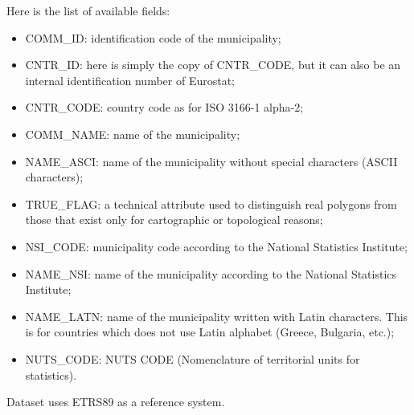 Here is the list of available fields:
\begin{itemize}
	\item COMM\_ID: identification code of the municipality;
	\item CNTR\_ID: here is simply the copy of CNTR\_CODE, but it can also be an internal identification number of Eurostat;
	\item CNTR\_CODE: country code as for ISO 3166-1 alpha-2;
	\item COMM\_NAME: name of the municipality;
	\item NAME\_ASCI: name of the municipality without special characters (ASCII characters);
	\item TRUE\_FLAG: a technical attribute used to distinguish real polygons from those that exist only for cartographic or topological reasons;
	\item NSI\_CODE: municipality code according to the National Statistics Institute;
	\item NAME\_NSI: name of the municipality according to the National Statistics Institute;
	\item NAME\_LATN: name of the municipality written with Latin characters. This is for countries which does not use Latin alphabet (Greece, Bulgaria, etc.);
	\item NUTS\_CODE: NUTS CODE (Nomenclature of territorial units for statistics).
\end{itemize}

Dataset uses ETRS89 as a reference system.









